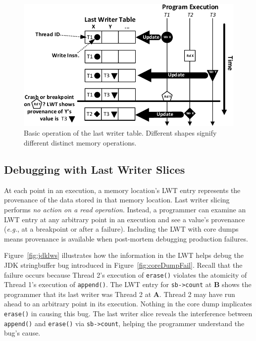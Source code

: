 \documentclass[pageno,nohyperref]{jpaper}
\newcommand{\lwt}{LWT\xspace}
\newcommand{\Caption}[1]{\begin{minipage}{.95\columnwidth} \caption{#1} \end{minipage} \vspace{-1.2ex}}
\begin{document}
\begin{figure}[h]
\centering
\includegraphics[scale=.6]{figs/BasicLWT.pdf}
\Caption{\label{fig:basicLWT}Basic operation of the last writer table. Different shapes signify different distinct memory operations. }
\end{figure}


\subsection{Debugging with Last Writer Slices}
\label{sec:debugging}

At each point in an execution, a memory location's \lwt entry represents the
provenance of the data stored in that memory location.   Last writer slicing
performs {\em no action on a read operation}.  Instead, a programmer can
examine an \lwt entry at any arbitrary point in an execution and see a value's
provenance ({\em e.g.}, at a breakpoint or after a failure).  Including the
\lwt with core dumps means provenance is available when post-mortem debugging
production failures.

Figure~\ref{fig:jdklws} illustrates how the information in the \lwt helps debug
the JDK stringbuffer bug introduced in Figure~\ref{fig:coreDumpFail}.  Recall
that the failure occurs because Thread 2's execution of {\tt erase()} violates
the atomicity of Thread 1's execution of {\tt append()}.  The \lwt entry for
{\tt sb->count} at {\bf B} shows the programmer that its last writer was Thread
2 at {\bf A}. Thread 2 may have run ahead to an arbitrary point in its
execution.  Nothing in the core dump implicates {\tt erase()} in causing
this bug.  The last writer slice reveals the interference between {\tt append()}
and {\tt erase()} via {\tt sb->count}, helping the programmer understand the
bug's cause.
\end{document}
